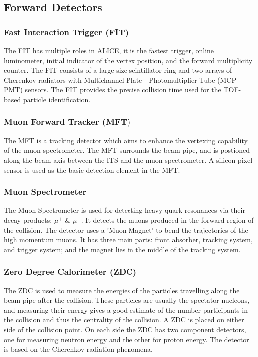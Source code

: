 \documentclass[12pt,a4paper,twoside]{report}
\begin{document}
\subsection{Forward Detectors}
\subsubsection{Fast Interaction Trigger (FIT)}
The FIT has multiple roles in ALICE, it is the fastest trigger, online luminometer, initial indicator of the vertex position, and the forward multiplicity counter. The FIT consists of a large-size scintillator ring and two arrays of Cherenkov radiators with Multichannel Plate - Photomultiplier Tube (MCP-PMT) sensors. The FIT provides the precise collision time used for the TOF-based particle identification. \cite{Ref:ALICE-detectors-FIT}
\subsubsection{Muon Forward Tracker (MFT)}
The MFT is a tracking detector which aims to enhance the vertexing capability of the muon spectrometer. The MFT surrounds the beam-pipe, and is postioned along the beam axis between the ITS and the muon spectrometer. A silicon pixel sensor is used as the basic detection element in the MFT. \cite{Ref:ALICE-detectors-MFT}
\subsubsection{Muon Spectrometer}
The Muon Spectrometer is used for detecting heavy quark resonances via their decay products: $\mu^{+}$ \& $\mu^{-}$. It detects the muons produced in the forward region of the collision. The detector uses a 'Muon Magnet' to bend the trajectories of the high momentum muons. It has three main parts: front absorber, tracking system, and trigger system; and the magnet lies in the middle of the tracking system.\cite{Ref:ALICE-detectors-MS}
\subsubsection{Zero Degree Calorimeter (ZDC)}
The ZDC is used to measure the energies of the particles travelling along the beam pipe after the collision. These particles are usually the spectator nucleons, and measuring their energy gives a good estimate of the number participants in the collision and thus the centrality of the collision. A ZDC is placed on either side of the collision point. On each side the ZDC has two component detectors, one for measuring neutron energy and the other for proton energy. The detector is based on the Cherenkov radiation phenomena.\cite{Ref:ALICE-detectors-ZDC}
\end{document}

